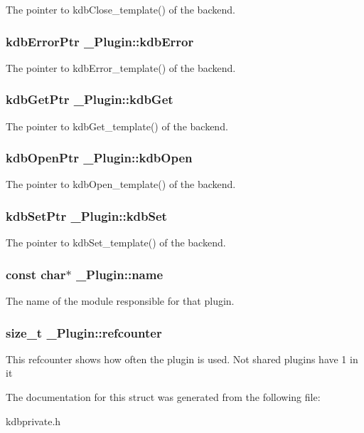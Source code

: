 \label{struct__Plugin_a5b0b2cc22ad5dcc7ec0eb570c2c6ff4b}
The pointer to kdbClose\_\-template() of the backend. \hypertarget{struct__Plugin_a621683acebfa6aac91c5903d8f6d653a}{
\subsubsection[{kdbError}]{\setlength{\rightskip}{0pt plus 5cm}kdbErrorPtr {\bf \_\-Plugin::kdbError}}}
\label{struct__Plugin_a621683acebfa6aac91c5903d8f6d653a}
The pointer to kdbError\_\-template() of the backend. \hypertarget{struct__Plugin_a0b2e0db2565e6f1d16f9b78112580a18}{
\subsubsection[{kdbGet}]{\setlength{\rightskip}{0pt plus 5cm}kdbGetPtr {\bf \_\-Plugin::kdbGet}}}
\label{struct__Plugin_a0b2e0db2565e6f1d16f9b78112580a18}
The pointer to kdbGet\_\-template() of the backend. \hypertarget{struct__Plugin_ac9da7168ac65402b997a31a3b4a8d720}{
\subsubsection[{kdbOpen}]{\setlength{\rightskip}{0pt plus 5cm}kdbOpenPtr {\bf \_\-Plugin::kdbOpen}}}
\label{struct__Plugin_ac9da7168ac65402b997a31a3b4a8d720}
The pointer to kdbOpen\_\-template() of the backend. \hypertarget{struct__Plugin_acaa373d251ec25ff93335741ddb5b0e3}{
\subsubsection[{kdbSet}]{\setlength{\rightskip}{0pt plus 5cm}kdbSetPtr {\bf \_\-Plugin::kdbSet}}}
\label{struct__Plugin_acaa373d251ec25ff93335741ddb5b0e3}
The pointer to kdbSet\_\-template() of the backend. \hypertarget{struct__Plugin_ad3ca225d725b5ae7b46754c025007a75}{
\subsubsection[{name}]{\setlength{\rightskip}{0pt plus 5cm}const char$\ast$ {\bf \_\-Plugin::name}}}
\label{struct__Plugin_ad3ca225d725b5ae7b46754c025007a75}
The name of the module responsible for that plugin. \hypertarget{struct__Plugin_a9be13e52b86cb351edd25a143d186da3}{
\subsubsection[{refcounter}]{\setlength{\rightskip}{0pt plus 5cm}size\_\-t {\bf \_\-Plugin::refcounter}}}
\label{struct__Plugin_a9be13e52b86cb351edd25a143d186da3}
This refcounter shows how often the plugin is used. Not shared plugins have 1 in it 

The documentation for this struct was generated from the following file:\begin{DoxyCompactItemize}
\item 
kdbprivate.h\end{DoxyCompactItemize}
